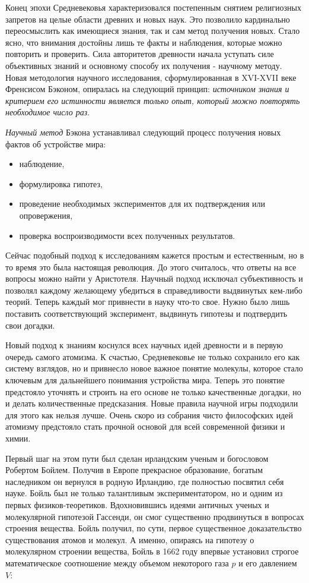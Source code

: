 Конец эпохи Средневековья характеризовался постепенным снятием религиозных запретов на целые области древних и новых наук. 
Это позволило кардинально переосмыслить как имеющиеся знания, так и сам метод получения новых.
Стало ясно, что внимания достойны лишь те факты и наблюдения, которые можно повторить и проверить.
Сила авторитетов древности начала уступать силе объективных знаний и основному способу их получения - научному методу.
Новая методология научного исследования, сформулированная в XVI-XVII веке Френсисом Бэконом, опиралась на следующий принцип: \textit{источником знания и критерием его истинности является только опыт, который можно повторять необходимое число раз}.

\textit{Научный метод} Бэкона устанавливал следующий процесс получения новых фактов об устройстве мира: 
\begin{itemize}
    \item наблюдение,
    \item формулировка гипотез,
    \item проведение необходимых экспериментов для их подтверждения или опровержения,
    \item проверка воспроизводимости всех полученных результатов.
\end{itemize}
Сейчас подобный подход к исследованиям кажется простым и естественным, но в то время это была настоящая революция.
До этого считалось, что ответы на все вопросы можно найти у Аристотеля.
Научный подход исключал субъективность и позволял каждому желающему убедиться в справедливости выдвинутых кем-либо теорий.
Теперь каждый мог привнести в науку что-то свое.
Нужно было лишь поставить соответствующий эксперимент, выдвинуть гипотезы и подтвердить свои догадки.

Новый подход к знаниям коснулся всех научных идей древности и в первую очередь самого атомизма.
К счастью, Средневековье не только сохранило его как систему взглядов, но и привнесло новое важное понятие молекулы, которое стало ключевым для дальнейшего понимания устройства мира. 
Теперь это понятие предстояло уточнять и строить на его основе не только качественные догадки, но и делать количественные предсказания.
Новые правила научной игры подходили для этого как нельзя лучше.
Очень скоро из собрания чисто философских идей атомизму предстояло стать прочной основой для всей современной физики и химии.

Первый шаг на этом пути был сделан ирландским ученым и богословом Робертом Бойлем.
Получив в Европе прекрасное образование, богатым наследником он вернулся в родную Ирландию, где полностью посвятил себя науке.
Бойль был не только талантливым экспериментатором, но и одним из первых физиков-теоретиков.
Вдохновившись идеями античных ученых и молекулярной гипотезой Гассенди, он смог существенно продвинуться в вопросах строения вещества. Бойль получил, по сути, первое существенное доказательство существования атомов и молекул.
А именно, опираясь на гипотезу о молекулярном строении вещества, Бойль в 1662 году впервые установил строгое математическое соотношение между объемом некоторого газа $p$ и его давлением $V$:

